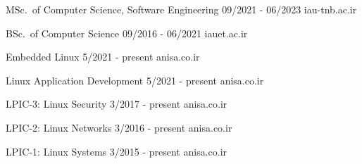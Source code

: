 \documentclass[a4paper,12pt]{memoir} %
\begin{document}

{MSc.\ of Computer Science, Software Engineering}
{09/2021 - 06/2023}
{}
{iau-tnb.ac.ir}

{BSc.\ of Computer Science}
{09/2016 - 06/2021}
{}
{iauet.ac.ir}


\Sep %







{Embedded Linux}
{5/2021 - present}
{}
{anisa.co.ir}


{Linux Application Development}
{5/2021 - present}
{}
{anisa.co.ir}


{LPIC-3: Linux Security}
{3/2017 - present}
{}
{anisa.co.ir}


{LPIC-2: Linux Networks}
{3/2016 - present}
{}
{anisa.co.ir}


{LPIC-1: Linux Systems}
{3/2015 - present}
{}
{anisa.co.ir}


\Sep %
\end{document}
